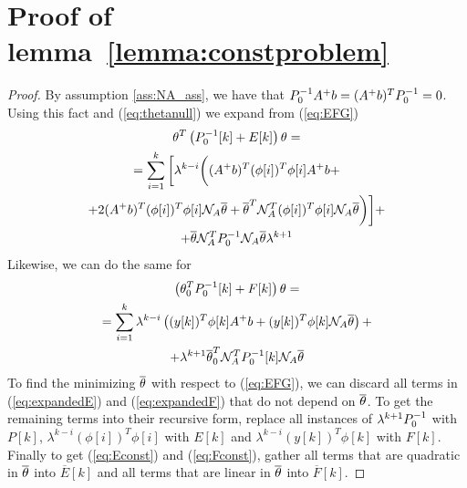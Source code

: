 
\section{Proof of lemma~\ref{lemma:constproblem}}
\label{app:constproof}
\begin{proof}
    By assumption \ref{ass:NA_ass}, we have that $P_0^{-1} A^+b = (A^+b)^TP_0^{-1} = 0$.
    Using this fact and (\ref{eq:thetanull}) we expand from (\ref{eq:EFG})
    \begin{equation}
        \begin{gathered}
            \theta^T\left(P_0^{-1}[k] + E[k]\right)\theta = \\
            = \sum\limits_{i=1}^k \bigg{[} \lambda^{k-i}\bigg{(}(A^+b)^T(\phi[i])^T\phi[i]A^+b
            + \\
            + 2(A^+b)^T(\phi[i])^T\phi[i]\mathcal{N}_A\overline{\theta} + \overline{\theta}^T\mathcal{N}_A^T(\phi[i])^T\phi[i]\mathcal{N}_A\overline{\theta} \bigg{)} \bigg{]} + \\
            + \overline{\theta}\mathcal{N}_A^TP_0^{-1}\mathcal{N}_A\overline{\theta}\lambda^{k+1}
        \end{gathered}
        \label{eq:expandedE}
    \end{equation}
    Likewise, we can do the same for 
    \begin{equation}
        \begin{gathered}
            \left(\theta_0^TP_0^{-1}[k] + F[k]\right)\theta = \\
            = \sum\limits_{i=1}^k \lambda^{k-i}\left((y[k])^T\phi[k]A^+b + (y[k])^T\phi[k]\mathcal{N}_A\overline{\theta}\right) + \\
            + \lambda^{k+1}\overline{\theta}_0^T\mathcal{N}_A^TP_0^{-1}[k]\mathcal{N}_A\overline{\theta}
        \end{gathered}
        \label{eq:expandedF}
    \end{equation}
    To find the minimizing $\overline{\theta}$ with respect to (\ref{eq:EFG}), we can discard
    all terms in (\ref{eq:expandedE}) and (\ref{eq:expandedF}) that do not depend on $\overline{\theta}$.
    To get the remaining terms into their recursive form, replace all instances of
    $\lambda^{k+1}P_0^{-1}$ with $P[k]$, $\lambda^{k-i}(\phi[i])^T\phi[i]$ with $E[k]$ and
    $\lambda^{k-i}(y[k])^T\phi[k]$ with $F[k]$. Finally to get (\ref{eq:Econst}) and (\ref{eq:Fconst}),
    gather all terms that are quadratic in $\overline{\theta}$ into $\overline{E}[k]$ and all terms that are linear in
    $\overline{\theta}$ into $\overline{F}[k]$.
\end{proof}